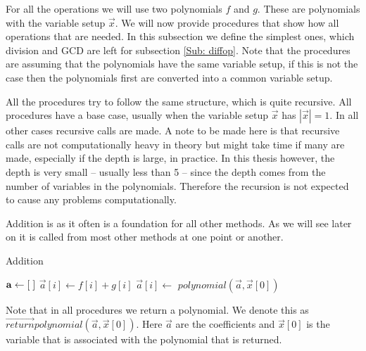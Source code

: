 For all the operations we will use two polynomials $f$ and $g$. These are polynomials with the variable setup $\vec{x}$. We will now provide procedures that show how all operations that are needed. In this subsection we define the simplest ones, which division and GCD are left for subsection \ref{Sub: diffop}. Note that the procedures are assuming that the polynomials have the same variable setup, if this is not the case then the polynomials first are converted into a common variable setup.

All the procedures try to follow the same structure, which is quite recursive. All procedures have a base case, usually when the variable setup $\vec{x}$ has $|\vec{x}|=1$. In all other cases recursive calls are made. A note to be made here is that recursive calls are not computationally heavy in theory but might take time if many are made, especially if the depth is large, in practice. In this thesis however, the depth is very small -- usually less than 5 -- since the depth comes from the number of variables in the polynomials. Therefore the recursion is not expected to cause any problems computationally.

Addition is as it often is a foundation for all other methods. As we will see later on it is called from most other methods at one point or another.
\begin{algorithm}[H]
  \caption{Addition}
  \begin{algorithmic}[1]
      \State $\mathbf{a}\gets [\hspace*{1mm}]$
          \State $\vec{a}[i]\gets f[i]+g[i]$
        \Else
          \State $\vec{a}[i]\gets$ 
        \EndIf
      \EndFor
      \State \Return $polynomial(\vec{a},\vec{x}[0])$
    \EndProcedure
  \end{algorithmic}
\end{algorithm}
\begin{remark}
  Note that in all procedures we return a polynomial. We denote this as $\vec{return } polynomial(\vec{a},\vec{x}[0])$. Here $\vec{a}$ are the coefficients and $\vec{x}[0]$ is the variable that is associated with the polynomial that is returned.
\end{remark}

